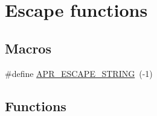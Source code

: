 \hypertarget{group___a_p_r___util___escaping}{}\section{Escape functions}
\label{group___a_p_r___util___escaping}
\subsection*{Macros}
\begin{DoxyCompactItemize}
\item 
\#define \hyperlink{group___a_p_r___util___escaping_ga793ae1b187ce490c65eeee2eb59d2831}{A\+P\+R\+\_\+\+E\+S\+C\+A\+P\+E\+\_\+\+S\+T\+R\+I\+NG}~(-\/1)
\end{DoxyCompactItemize}
\subsection*{Functions}
